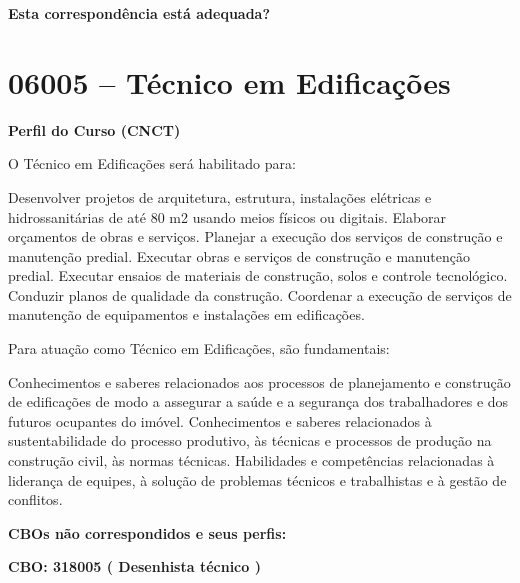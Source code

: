 \documentclass[
]{article}
\begin{document}
\begin{Form}
\textbf{Esta correspondência está adequada?} \\ 
\end{Form}

\newpage
\section{ 06005 -- Técnico em Edificações }

\textbf{Perfil do Curso (CNCT)}

O Técnico em Edificações será habilitado para:

Desenvolver projetos de arquitetura, estrutura, instalações elétricas e
hidrossanitárias de até 80 m2 usando meios físicos ou digitais. Elaborar
orçamentos de obras e serviços. Planejar a execução dos serviços de
construção e manutenção predial. Executar obras e serviços de construção
e manutenção predial. Executar ensaios de materiais de construção, solos
e controle tecnológico. Conduzir planos de qualidade da construção.
Coordenar a execução de serviços de manutenção de equipamentos e
instalações em edificações.

Para atuação como Técnico em Edificações, são fundamentais:

Conhecimentos e saberes relacionados aos processos de planejamento e
construção de edificações de modo a assegurar a saúde e a segurança dos
trabalhadores e dos futuros ocupantes do imóvel. Conhecimentos e saberes
relacionados à sustentabilidade do processo produtivo, às técnicas e
processos de produção na construção civil, às normas técnicas.
Habilidades e competências relacionadas à liderança de equipes, à
solução de problemas técnicos e trabalhistas e à gestão de conflitos.

\textbf{CBOs não correspondidos e seus perfis:}

\textbf{CBO: 318005  ( Desenhista técnico )}
\end{document}
